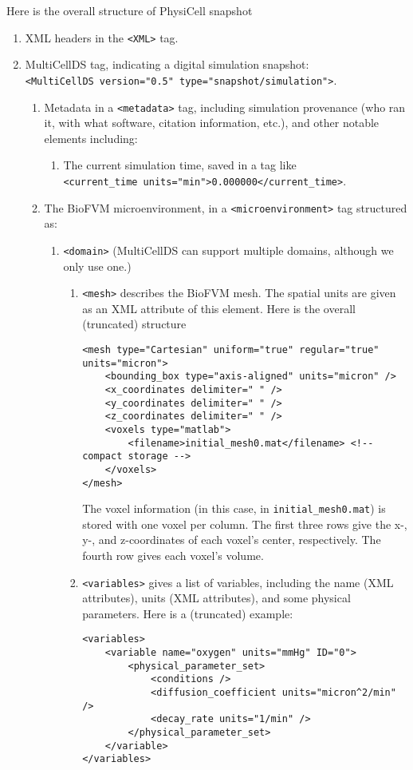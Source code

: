 \documentclass[12pt]{article}
\renewcommand{\v}{\verb}
\begin{document}
Here is the overall structure of PhysiCell snapshot
\begin{enumerate}
\item 
XML headers in the \v|<XML>| tag. 
\item 
MultiCellDS tag, indicating a digital simulation snapshot: \\
\v|<MultiCellDS version="0.5" type="snapshot/simulation">|. 

\begin{enumerate}
\item 
Metadata in a \v|<metadata>| tag, including simulation 
provenance (who ran it, with what software, citation 
information, etc.), and other notable elements including: 

\begin{enumerate}
\item 
The current simulation time, saved in a tag like \\
\v|<current_time units="min">0.000000</current_time>|. 
\end{enumerate}


\item 
The BioFVM microenvironment, in a \v|<microenvironment>| tag 
structured as: 
\begin{enumerate}
\item 
\v|<domain>| (MultiCellDS can support multiple domains, although we only use one.)

\begin{enumerate}
\item 
\v|<mesh>| describes the BioFVM mesh. The spatial units are given as an XML 
attribute of this element. Here is the overall (truncated) structure
\begin{verbatim}
<mesh type="Cartesian" uniform="true" regular="true" units="micron">
    <bounding_box type="axis-aligned" units="micron" />
    <x_coordinates delimiter=" " />
    <y_coordinates delimiter=" " />
    <z_coordinates delimiter=" " />
    <voxels type="matlab">
        <filename>initial_mesh0.mat</filename> <!-- compact storage -->
    </voxels>
</mesh>
\end{verbatim}
The voxel information (in this case, in \v|initial_mesh0.mat|) is stored 
with one voxel per column. The first three rows give the x-, y-, and z-coordinates 
of each voxel's center, respectively. The fourth row gives each voxel's 
volume. 

\item 
\v|<variables>| gives a list of variables, including the name (XML attributes), 
units (XML attributes), and some physical parameters. Here is a (truncated) example: 
\begin{verbatim}
<variables>
    <variable name="oxygen" units="mmHg" ID="0">
        <physical_parameter_set>
            <conditions />
            <diffusion_coefficient units="micron^2/min" />
            <decay_rate units="1/min" />
        </physical_parameter_set>
    </variable>
</variables>
\end{verbatim}


\end{enumerate}
\end{enumerate}
\end{enumerate}
\end{enumerate}
\end{document}
